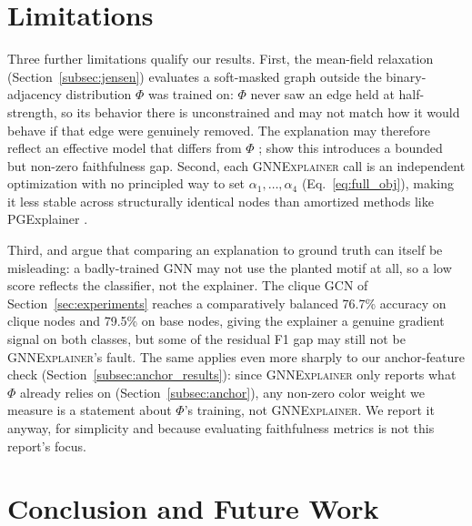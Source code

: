 \documentclass{article}
\newcommand{\GNNEx}{\textsc{GNNExplainer}\xspace}
\theoremstyle{definition}
\begin{document}
\section{Limitations}
\label{sec:limitations}

Three further limitations qualify our results. First, the mean-field
relaxation (Section~\ref{subsec:jensen}) evaluates a soft-masked graph
outside the binary-adjacency distribution $\Phi$ was trained on: $\Phi$
never saw an edge held at half-strength, so its behavior there is
unconstrained and may not match how it would behave if that edge were
genuinely removed. The explanation may therefore reflect an effective model
that differs from $\Phi$ \citep{yuan2022explainability};
\citet{agarwal2022probing} show this introduces a bounded but non-zero
faithfulness gap. Second, each \GNNEx call is an independent optimization
with no principled way to set $\alpha_1,\ldots,\alpha_4$
(Eq.~\ref{eq:full_obj}), making it less stable across structurally
identical nodes than amortized methods like PGExplainer
\citep{luo2020parameterized}.

Third, \citet{faber2021when} and \citet{agarwal2022probing} argue that
comparing an explanation to ground truth can itself be misleading: a
badly-trained GNN may not use the planted motif at all, so a low score
reflects the classifier, not the explainer. The clique GCN of
Section~\ref{sec:experiments} reaches a comparatively balanced 76.7\%
accuracy on clique nodes and 79.5\% on base nodes, giving the explainer a
genuine gradient signal on both classes, but some of the residual F1 gap
may still not be \GNNEx's fault. The same applies even more sharply to our
anchor-feature check (Section~\ref{subsec:anchor_results}): since \GNNEx
only reports what $\Phi$ already relies on (Section~\ref{subsec:anchor}),
any non-zero color weight we measure is a statement about $\Phi$'s
training, not \GNNEx. We report it anyway, for simplicity and because
evaluating faithfulness metrics is not this report's focus.


\section{Conclusion and Future Work}
\label{sec:conclusion}
\end{document}
